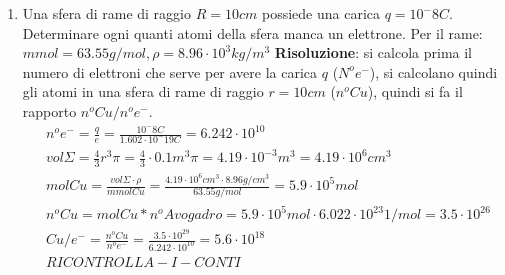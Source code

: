\documentclass{book}
\begin{document}
\begin{enumerate}

    \item Una sfera di rame di raggio $R = 10cm$ possiede una carica $q=10^-8 C$. Determinare ogni quanti atomi della sfera manca un elettrone. Per il rame: $mmol=63.55 g/mol, \rho = 8.96 \cdot 10^3 kg/m^3$\newline
    \textbf{Risoluzione}: si calcola prima il numero di elettroni che serve per avere la carica $q$ ($N^oe^-$), si calcolano quindi gli atomi in una sfera di rame di raggio $r = 10cm$ ($n^oCu$), quindi si fa il rapporto $n^oCu/n^oe^-$.
        \begin{align*}
            & n^o e^- =\frac{q}{e}=\frac{10^-8 C}{1.602 \cdot 10^-19 C} = 6.242 \cdot 10^{10} \\
            & vol \Sigma = \frac{4}{3} r^3 \pi = \frac{4}{3} \cdot 0.1m^3 \pi= 4.19 \cdot 10^{-3} m^3 =  4.19 \cdot 10^{6} cm^3 \\
            & mol Cu = \frac{vol\Sigma \cdot \rho }{mmolCu} = \frac{ 4.19 \cdot 10^{6}cm^3 \cdot 8.96 g/cm^3}{63.55 g/mol} = 5.9 \cdot 10^5mol \\
            & n^o Cu =  molCu * n^o Avogadro = 5.9 \cdot 10^5 mol \cdot 6.022 \cdot 10^{23} 1/mol = 3.5 \cdot 10^{26} \\
            & Cu/e^- = \frac{n^o Cu}{n^o e^-} = \frac{3.5 \cdot 10^{29}}{6.242 \cdot 10^{10}} = 5.6 \cdot 10^{18} \\
            & RICONTROLLA-I-CONTI
        \end{align*}


\end{enumerate}
\end{document}
